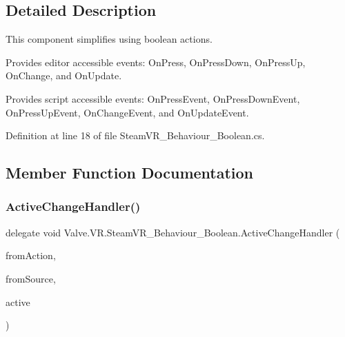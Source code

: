 \subsection{Detailed Description}
This component simplifies using boolean actions. 

Provides editor accessible events\+: On\+Press, On\+Press\+Down, On\+Press\+Up, On\+Change, and On\+Update.

Provides script accessible events\+: On\+Press\+Event, On\+Press\+Down\+Event, On\+Press\+Up\+Event, On\+Change\+Event, and On\+Update\+Event.

Definition at line 18 of file Steam\+V\+R\+\_\+\+Behaviour\+\_\+\+Boolean.\+cs.



\subsection{Member Function Documentation}
\mbox{\label{class_valve_1_1_v_r_1_1_steam_v_r___behaviour___boolean_a4629d21a26e1e23cf5d7d6ddee6331ba}} 
\subsubsection{\texorpdfstring{ActiveChangeHandler()}{ActiveChangeHandler()}}
{\footnotesize\ttfamily delegate void Valve.\+V\+R.\+Steam\+V\+R\+\_\+\+Behaviour\+\_\+\+Boolean.\+Active\+Change\+Handler (\begin{DoxyParamCaption}\item[{\mbox{\hyperlink{class_valve_1_1_v_r_1_1_steam_v_r___behaviour___boolean}{Steam\+V\+R\+\_\+\+Behaviour\+\_\+\+Boolean}}}]{from\+Action,  }\item[{\mbox{\hyperlink{namespace_valve_1_1_v_r_a82e5bf501cc3aa155444ee3f0662853f}{Steam\+V\+R\+\_\+\+Input\+\_\+\+Sources}}}]{from\+Source,  }\item[{bool}]{active }\end{DoxyParamCaption})}

\mbox{\label{class_valve_1_1_v_r_1_1_steam_v_r___behaviour___boolean_ace248524b7a7f0cf0e7481daa34fa01b}} 

